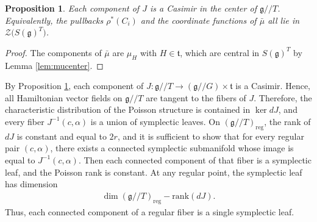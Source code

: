 \documentclass[11pt,reqno]{amsart}
\newtheorem*{theorem A}{Main Theorem A}
\newtheorem*{theorem B}{Main Theorem B}
\newtheorem*{theorem C}{Main Theorem C}
\newtheorem*{theorem D}{Main Theorem D}
\newtheorem{proposition}[theorem]{Proposition}
\theoremstyle{definition}
\theoremstyle{plain}
\theoremstyle{conclusion}
\begin{document}
\begin{proposition}
\label{prop:Jcenter}
Each component of $J$ is a Casimir in the center of $\mathfrak{g}//T$. Equivalently, the pullbacks $\rho^*(C_i)$ and the coordinate functions of $\bar{\mu}$ all lie in $\mathcal{Z} \bigl(S(\mathfrak{g})^T\bigr)$.
\end{proposition}
\begin{proof}
 The components of $\bar{\mu}$ are $\mu_H$ with $H\in\mathfrak{t}$, which are central in $S(\mathfrak{g})^T$ by Lemma \ref{lem:mucenter}.
\end{proof}

By Proposition \ref{prop:Jcenter}, each component of $J:\mathfrak{g}//T \rightarrow (\mathfrak{g}//G) \times \mathfrak{t}$ is a Casimir. Hence, all Hamiltonian vector fields on $\mathfrak{g}//T$ are tangent to the fibers of $J$. Therefore, the characteristic distribution of the Poisson structure is contained in $\ker dJ$, and every fiber $J^{-1}(c, \alpha)$ is a union of symplectic leaves.  %
 On  $(\mathfrak{g}//T)_{\mathrm{reg}}$, the rank of $dJ$ is constant and equal to $2r$, and it is sufficient to show that for every regular pair $(c,\alpha)$, there exists a connected symplectic submanifold whose image is equal to $J^{-1}(c,\alpha)$. Then each connected component of that fiber is a symplectic leaf, and the Poisson rank is constant. At any regular point, the symplectic leaf has dimension \begin{align*}
  \dim(\mathfrak{g}//T)_{\mathrm{reg}}-\mathrm{rank}(dJ).
\end{align*}  Thus, each connected component of a regular fiber is a single symplectic leaf. 
\end{document}
